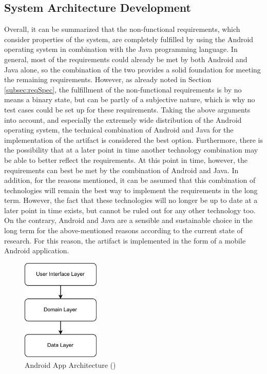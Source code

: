 \subsection{System Architecture Development}

Overall, it can be summarized that the non-functional requirements, which consider properties of the system, are completely fulfilled by using the Android operating system in combination with the Java programming language. In general, most of the requirements could already be met by both Android and Java alone, so the combination of the two provides a solid foundation for meeting the remaining requirements. However, as already noted in Section \ref{subsec:reqSpec}, the fulfillment of the non-functional requirements is by no means a binary state, but can be partly of a subjective nature, which is why no test cases could be set up for these requirements. Taking the above arguments into account, and especially the extremely wide distribution of the Android operating system, the technical combination of Android and Java for the implementation of the artifact is considered the best option. Furthermore, there is the possibility that at a later point in time another technology combination may be able to better reflect the requirements. At this point in time, however, the requirements can best be met by the combination of Android and Java. In addition, for the reasons mentioned, it can be assumed that this combination of technologies will remain the best way to implement the requirements in the long term. However, the fact that these technologies will no longer be up to date at a later point in time exists, but cannot be ruled out for any other technology too. On the contrary, Android and Java are a sensible and sustainable choice in the long term for the above-mentioned reasons according to the current state of research. For this reason, the artifact is implemented in the form of a mobile Android application.

\begin{figure}[htbp]
    \centering
    \includegraphics[width=0.33\textwidth, keepaspectratio]{content/05_design_and_dev_artefacts/ArchitectureBestPracticeAndroid.drawio.pdf}
    \caption[Android App Architecture]{Android App Architecture (\cite{Google.2023})}    
    \label{fig:androidAppArchitecture}
\end{figure}

